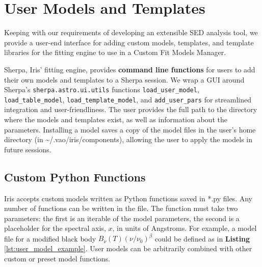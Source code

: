 \documentclass[5p]{elsarticle}
\begin{document}
\section{User Models and Templates}
\label{sec:usermodels}

Keeping with our requirements of developing an extensible SED analysis tool, we provide a user-end interface for adding custom models, templates, and template libraries for the fitting engine to use in a Custom Fit Models Manager.

Sherpa, Iris' fitting engine, provides \textbf{command line functions} for users to add their own models and templates to a Sherpa session. We wrap a GUI around Sherpa's \texttt{sherpa.astro.ui.utils} functions \texttt{load\_user\_model}, \texttt{load\_table\_model}, \texttt{load\_template\_model}, and \texttt{add\_user\_pars} for streamlined integration and user-friendliness. The user provides the full path to the directory where the models and templates exist, as well as information about the parameters. Installing a model saves a copy of the model files in the user's home directory (in \~{}/.vao/iris/components), allowing the user to apply the models in future sessions.


\subsection{Custom Python Functions}
Iris accepts custom models written as Python functions saved in *.py files. Any number of functions can be written in the file. The function must take two parameters: the first is an iterable of the model parameters, the second is a placeholder for the spectral axis, $x$, in units of Angstroms. For example, a model file for a modified black body
\(B_{\nu}(T) \left(\nu/\nu_{0}\right)^{\beta}\)
could be defined as in \textbf{Listing} \ref{lst:user_model_example}. User models can be arbitrarily combined with other custom or preset model functions.
\end{document}
